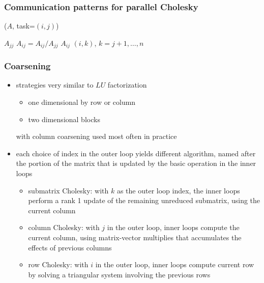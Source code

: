 \begin{frame}[fragile]
%
  \frametitle{Communication patterns for parallel Cholesky}
%
  \begin{center}
    \small
    \begin{minipage}{.85\linewidth}
      \begin{algorithm}[H]
        \label{alg:pCholesky}
%
        \DontPrintSemicolon
        \SetAlCapHSkip{0ex}
%
        \caption{\cholesky($A$, task=$(i,j)$)}
%
         {
          \KwRecv $A_{jj}$ \;
          $A_{ij} = A_{ij}/A_{jj}$ \;
          \KwBcast $A_{ij}$ \KwTo $(i,k)$, $k=j+1,\ldots,n$
        }
% 
      \end{algorithm}
    \end{minipage}
  \end{center}
%
\end{frame}

\begin{frame}[fragile]
%
  \frametitle{Coarsening}
%
  \begin{itemize}
%
  \item strategies very similar to $LU$ factorization
    \begin{itemize}
    \item one dimensional by row or column
    \item two dimensional blocks
    \end{itemize}
    with column coarsening used most often in practice
%
  \item each choice of index in the outer loop yields different algorithm, named after the
    portion of the matrix that is updated by the basic operation in the inner loops
%
    \begin{itemize}
    \item submatrix Cholesky: with $k$ as the outer loop index, the inner loops perform a rank
      1 update of the remaining unreduced submatrix, using the current column
    \item column Cholesky: with $j$ in the outer loop, inner loops compute the current column,
      using matrix-vector multiplies that accumulates the effects of previous columns
    \item row Cholesky: with $i$ in the outer loop, inner loops compute current row by solving
      a triangular system involving the previous rows
    \end{itemize}
%
  \end{itemize}
%
\end{frame}


